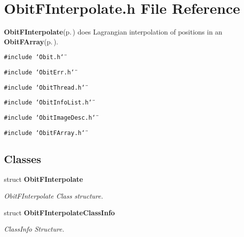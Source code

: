 \section{Obit\-FInterpolate.h File Reference}
\label{ObitFInterpolate_8h}
{\bf Obit\-FInterpolate}{\rm (p.\,\pageref{structObitFInterpolate})} does Lagrangian interpolation of positions in an {\bf Obit\-FArray}{\rm (p.\,\pageref{structObitFArray})}. 

{\tt \#include \char`\"{}Obit.h\char`\"{}}\par
{\tt \#include \char`\"{}Obit\-Err.h\char`\"{}}\par
{\tt \#include \char`\"{}Obit\-Thread.h\char`\"{}}\par
{\tt \#include \char`\"{}Obit\-Info\-List.h\char`\"{}}\par
{\tt \#include \char`\"{}Obit\-Image\-Desc.h\char`\"{}}\par
{\tt \#include \char`\"{}Obit\-FArray.h\char`\"{}}\par
\subsection*{Classes}
\begin{CompactItemize}
\item 
struct {\bf Obit\-FInterpolate}
\begin{CompactList}\small\item\em Obit\-FInterpolate Class structure. \item\end{CompactList}\item 
struct {\bf Obit\-FInterpolate\-Class\-Info}
\begin{CompactList}\small\item\em Class\-Info Structure. \item\end{CompactList}\end{CompactItemize}
